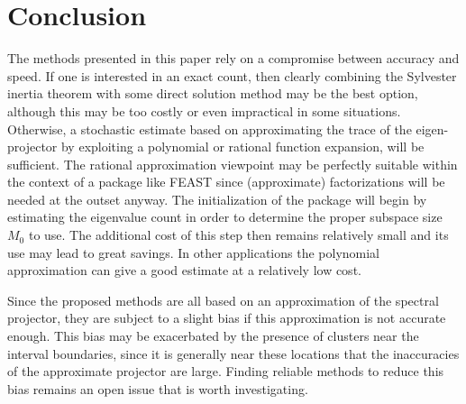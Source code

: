 \documentclass[12pt]{article}		\usepackage{tabls,multirow}
\begin{document}
\section{Conclusion}\label{sec:concl} 
The methods  presented in this paper rely on a compromise
between accuracy and speed. If one is interested in an exact
count, then clearly combining  the Sylvester inertia theorem
with some direct solution method may be the best option, although
this may be too costly or even impractical in some situations.
Otherwise, a stochastic estimate based on approximating the trace
of the eigen-projector by exploiting a polynomial or rational function
expansion, will be sufficient.
The rational approximation viewpoint may be perfectly suitable 
within the context  of a package like FEAST since 
(approximate) factorizations will be needed at the outset anyway.
The initialization of the package will begin by estimating
the eigenvalue count in order to determine the proper subspace 
size $M_0$ to use. The additional cost of this step then remains
relatively small and its use may lead to great savings.
In other applications the polynomial approximation can give
a good estimate at a relatively low cost.

Since the  proposed methods are all  based on an  approximation of the
spectral  projector,  they  are  subject  to a  slight  bias  if  this
approximation is not accurate enough.  This bias may be exacerbated by
the presence of clusters near  the interval boundaries, since it is
generally near these locations that the inaccuracies of the 
approximate projector are large. 
Finding reliable methods to reduce this bias 
remains an open issue that is worth investigating.




\end{document}
